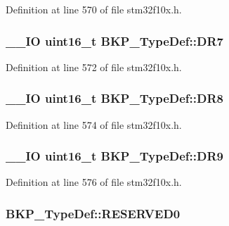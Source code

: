 Definition at line 570 of file stm32f10x.\-h.

\hypertarget{struct_b_k_p___type_def_a2467a2e314a670b8638ad75f6d9122bf}{
\subsubsection[{D\-R7}]{\setlength{\rightskip}{0pt plus 5cm}\-\_\-\-\_\-\-I\-O {\bf uint16\-\_\-t} B\-K\-P\-\_\-\-Type\-Def\-::\-D\-R7}}\label{struct_b_k_p___type_def_a2467a2e314a670b8638ad75f6d9122bf}


Definition at line 572 of file stm32f10x.\-h.

\hypertarget{struct_b_k_p___type_def_a70ccbdbdaf902903f378f110685ee647}{
\subsubsection[{D\-R8}]{\setlength{\rightskip}{0pt plus 5cm}\-\_\-\-\_\-\-I\-O {\bf uint16\-\_\-t} B\-K\-P\-\_\-\-Type\-Def\-::\-D\-R8}}\label{struct_b_k_p___type_def_a70ccbdbdaf902903f378f110685ee647}


Definition at line 574 of file stm32f10x.\-h.

\hypertarget{struct_b_k_p___type_def_abb6f0e3c783959e88117f81a981c4000}{
\subsubsection[{D\-R9}]{\setlength{\rightskip}{0pt plus 5cm}\-\_\-\-\_\-\-I\-O {\bf uint16\-\_\-t} B\-K\-P\-\_\-\-Type\-Def\-::\-D\-R9}}\label{struct_b_k_p___type_def_abb6f0e3c783959e88117f81a981c4000}


Definition at line 576 of file stm32f10x.\-h.

\hypertarget{struct_b_k_p___type_def_a8b41b52d05011ff2ed2b85977ea20413}{
\subsubsection[{R\-E\-S\-E\-R\-V\-E\-D0}]{ B\-K\-P\-\_\-\-Type\-Def\-::\-R\-E\-S\-E\-R\-V\-E\-D0}}\label{struct_b_k_p___type_def_a8b41b52d05011ff2ed2b85977ea20413}


